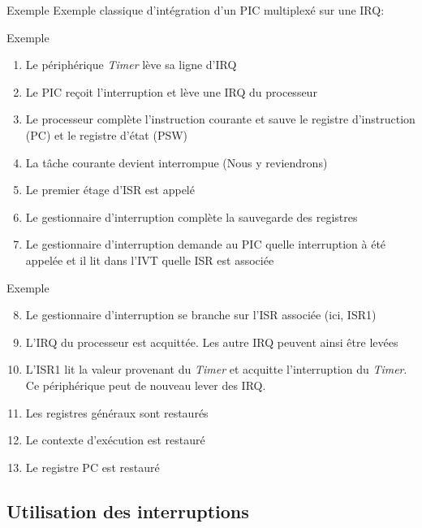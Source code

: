 \begin{frame}{Exemple}
  Exemple classique d'intégration d'un PIC multiplexé sur une IRQ:
  \begin{center}
  \end{center}
\end{frame}

\begin{frame}{Exemple}
  \begin{enumerate}
  \item Le périphérique \emph{Timer} lève sa ligne d'IRQ
  \item Le PIC reçoit l'interruption et lève une IRQ du processeur
  \item  Le processeur  complète  l'instruction courante  et sauve  le
    registre d'instruction (PC) et le registre d'état (PSW)
  \item La tâche courante devient interrompue (Nous y reviendrons)
  \item Le premier étage d'ISR est appelé
  \item  Le  gestionnaire d'interruption  complète  la sauvegarde  des
    registres
  \item   Le  gestionnaire  d'interruption   demande  au   PIC  quelle
    interruption à  été appelée  et il lit  dans l'IVT quelle  ISR est
    associée
  \end{enumerate}
\end{frame}

\begin{frame}{Exemple}
  \begin{enumerate}
    \setcounter{enumi}{7}
  \item Le  gestionnaire d'interruption se branche  sur l'ISR associée
    (ici, ISR1)
  \item L'IRQ du processeur est acquittée. Les autre IRQ peuvent ainsi
    être levées
  \item  L'ISR1 lit la  valeur provenant  du \emph{Timer}  et acquitte
    l'interruption  du \emph{Timer}. Ce  périphérique peut  de nouveau
    lever des IRQ.
  \item Les registres généraux sont restaurés
  \item Le contexte d'exécution est restauré
  \item Le registre PC est restauré
  \end{enumerate}
\end{frame}

\subsection{Utilisation des interruptions}

